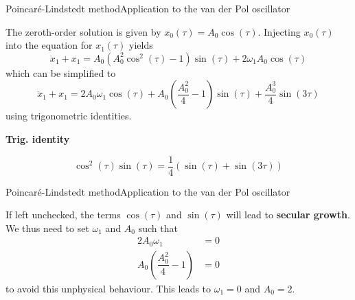 \documentclass[usenames,dvipsnames,svgnames,10pt,aspectratio=169]{beamer}
\begin{document}
\begin{frame}[t, c]{Poincaré-Lindstedt method}{Application to the van der Pol oscillator}
  \begin{minipage}{.58\textwidth}
    The zeroth-order solution is given by $x_0(\tau) = A_0 \cos(\tau)$.
    Injecting $x_0(\tau)$ into the equation for $x_1(\tau)$ yields
    \[
    \ddot{x}_1 + x_1 = A_0 \left( A_0^2 \cos^2(\tau) - 1 \right) \sin(\tau) + 2\omega_1 A_0 \cos(\tau)
    \]
    which can be simplified to
    \[
    \ddot{x}_1 + x_1 = 2 A_0 \omega_1 \cos(\tau) + A_0 \left( \dfrac{A_0^2}{4} - 1\right) \sin(\tau) + \dfrac{A_0^3}{4} \sin(3\tau)
    \]
    using trigonometric identities.
  \end{minipage}%
  \hfill
  \begin{minipage}{.38\textwidth}
    \centering \textbf{Trig. identity}

    \[
    \cos^2(\tau) \sin(\tau) = \dfrac{1}{4} \left( \sin(\tau) + \sin(3\tau) \right)
    \]
  \end{minipage}

  \vspace{1cm}
\end{frame}

\begin{frame}[t, c]{Poincaré-Lindstedt method}{Application to the van der Pol oscillator}
  \begin{minipage}{.68\textwidth}
    If left unchecked, the terms $\cos(\tau)$ and $\sin(\tau)$ will lead to \alert{\textbf{secular growth}}.
    We thus need to set $\omega_1$ and $A_0$ such that
    \[
    \begin{aligned}
      2 A_0 \omega_1 & = 0 \\
      A_0 \left( \dfrac{A_0^2}{4} - 1 \right) & = 0
    \end{aligned}
    \]
    to avoid this unphysical behaviour.
    This leads to $\omega_1 = 0$ and $A_0 = 2$.
  \end{minipage}%
  \hfill
  \begin{minipage}{.28\textwidth}
    \centering
  \end{minipage}

  \vspace{1cm}
\end{frame}
\end{document}
